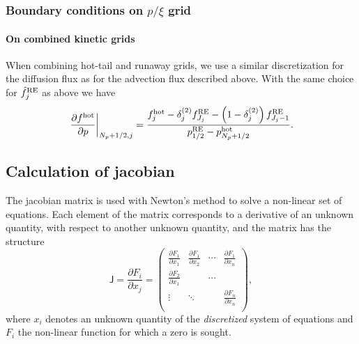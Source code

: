 \documentclass{notes}
\newcommand{\Jac}{\mathsf{J}}
\begin{document}
	\subsubsection{Boundary conditions on $p/\xi$ grid}

    \paragraph{On combined kinetic grids}
    When combining hot-tail and runaway grids, we use a similar discretization
    for the diffusion flux as for the advection flux described above. With the
    same choice for $\hat{f}^{\rm RE}_j$ as above we have
    \begin{equation}
        \left.\frac{\partial f^{\rm hot}}{\partial p}\right|_{N_p+1/2,j} =
            \frac{f^{\rm hot}_j - \delta^{(2)}_j f_{J_j}^{\rm RE} -
            \left( 1 - \delta^{(2)}_j \right) f^{\rm RE}_{J_j-1}}
            {p^{\rm RE}_{1/2} - p^{\rm hot}_{N_p+1/2}}.
    \end{equation}

    \subsection{Calculation of jacobian}
    The jacobian matrix is used with Newton's method to solve a non-linear set
    of equations. Each element of the matrix corresponds to a derivative of an
    unknown quantity, with respect to another unknown quantity, and the matrix
    has the structure
    \begin{equation}
        \Jac = \frac{\partial F_i}{\partial x_j} = \begin{pmatrix}
            \frac{\partial F_1}{\partial x_1} & \frac{\partial F_1}{\partial x_2} & \cdots & \frac{\partial F_1}{\partial x_n}\\
            \frac{\partial F_2}{\partial x_1} & & \cdots & \\
            \vdots & \ddots & & \frac{\partial F_n}{\partial x_n} \\
        \end{pmatrix},
    \end{equation}
    where $x_i$ denotes an unknown quantity of the {\em discretized} system of
    equations and $F_i$ the non-linear function for which a zero is sought.
\end{document}
